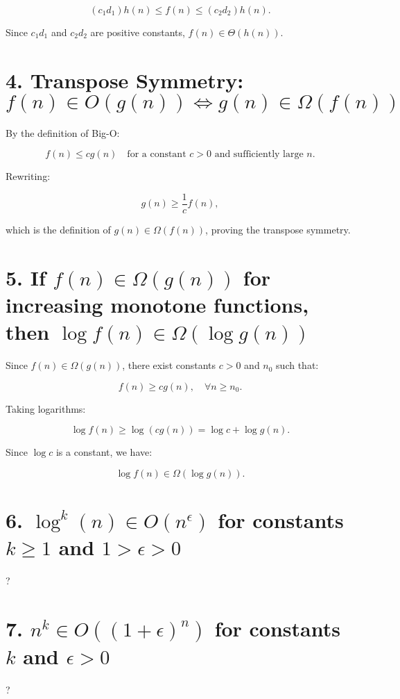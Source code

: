 \documentclass{article}
\begin{document}
\[
(c_1 d_1) h(n) \leq f(n) \leq (c_2 d_2) h(n).
\]

Since \( c_1 d_1 \) and \( c_2 d_2 \) are positive constants, \( f(n) \in \Theta(h(n)) \).

\section*{4. Transpose Symmetry: \( f(n) \in O(g(n)) \iff g(n) \in \Omega(f(n)) \)}

By the definition of Big-O:

\[
f(n) \leq c g(n) \quad \text{for a constant } c > 0 \text{ and sufficiently large } n.
\]

Rewriting:

\[
g(n) \geq \frac{1}{c} f(n),
\]

which is the definition of \( g(n) \in \Omega(f(n)) \), proving the transpose symmetry. 

\section*{5. If \( f(n) \in \Omega(g(n)) \) for increasing monotone functions, then \( \log f(n) \in \Omega(\log g(n)) \)}

Since \( f(n) \in \Omega(g(n)) \), there exist constants \( c > 0 \) and \( n_0 \) such that:

\[
f(n) \geq c g(n), \quad \forall n \geq n_0.
\]

Taking logarithms:

\[
\log f(n) \geq \log (c g(n)) = \log c + \log g(n).
\]

Since \( \log c \) is a constant, we have:

\[
\log f(n) \in \Omega(\log g(n)).
\]

\section*{6. \( \log^k(n) \in O(n^\epsilon) \) for constants \( k \geq 1 \) and \( 1 > \epsilon > 0 \) }

?

\section*{7. \( n^k \in O((1+\epsilon)^n) \) for constants \( k \) and \( \epsilon > 0 \) }
?
\end{document}
